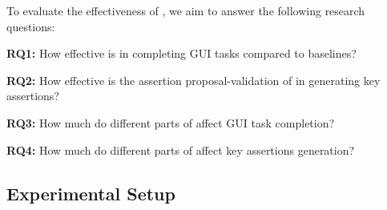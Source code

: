 
To evaluate the effectiveness of \toolNameSmall{}, we aim to answer the following research questions:




\textbf{RQ1:} How effective is \toolNameSmall{} in completing GUI tasks compared to baselines?

\textbf{RQ2:} How effective is the assertion proposal-validation of \toolNameSmall{} in generating key assertions?


\textbf{RQ3:} How much do different parts of \toolNameSmall{} affect GUI task completion?

\textbf{RQ4:} How much do different parts of \toolNameSmall{} affect key assertions generation?











\subsection{Experimental Setup}
\label{sec:experimental-setup}


